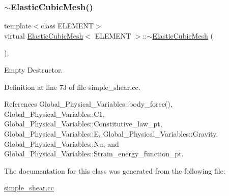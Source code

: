 \mbox{\label{classElasticCubicMesh_a64cc078916561417462636f399a71e88}} 
\subsubsection{\texorpdfstring{$\sim$\+Elastic\+Cubic\+Mesh()}{~ElasticCubicMesh()}}
{\footnotesize\ttfamily template$<$class E\+L\+E\+M\+E\+NT$>$ \\
virtual \hyperlink{classElasticCubicMesh}{Elastic\+Cubic\+Mesh}$<$ E\+L\+E\+M\+E\+NT $>$\+::$\sim$\hyperlink{classElasticCubicMesh}{Elastic\+Cubic\+Mesh} (\begin{DoxyParamCaption}{ }\end{DoxyParamCaption})\hspace{0.3cm}{\ttfamily [inline]}, {\ttfamily [virtual]}}



Empty Destructor. 



Definition at line 73 of file simple\+\_\+shear.\+cc.



References Global\+\_\+\+Physical\+\_\+\+Variables\+::body\+\_\+force(), Global\+\_\+\+Physical\+\_\+\+Variables\+::\+C1, Global\+\_\+\+Physical\+\_\+\+Variables\+::\+Constitutive\+\_\+law\+\_\+pt, Global\+\_\+\+Physical\+\_\+\+Variables\+::E, Global\+\_\+\+Physical\+\_\+\+Variables\+::\+Gravity, Global\+\_\+\+Physical\+\_\+\+Variables\+::\+Nu, and Global\+\_\+\+Physical\+\_\+\+Variables\+::\+Strain\+\_\+energy\+\_\+function\+\_\+pt.



The documentation for this class was generated from the following file\+:\begin{DoxyCompactItemize}
\item 
\hyperlink{simple__shear_8cc}{simple\+\_\+shear.\+cc}\end{DoxyCompactItemize}
